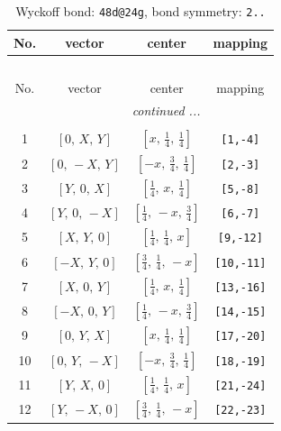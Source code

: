 \documentclass[fleqn,8pt]{jsarticle}
\begin{document}
\renewcommand{\arraystretch}{1.2}
\begin{longtable}{cccc}
\caption{Wyckoff bond: {\tt 48d@24g}, bond symmetry: {\tt 2..}}
 \\
 \hline \hline
No. & vector & center & mapping \\ \hline \endfirsthead

\multicolumn{3}{l}{\tablename\ \thetable{}} \\
 \hline \hline
No. & vector & center & mapping \\ \hline \endhead

 \hline \hline
\multicolumn{3}{r}{\footnotesize\it continued ...} \\ \endfoot

 \hline \hline
\multicolumn{3}{r}{} \\ \endlastfoot

1 & $\left[ 0,\, X,\, Y \right]$ & $\left[ x,\, \frac{1}{4},\, \frac{1}{4} \right]$ & {\tt [1,-4]} \\ \hline
2 & $\left[ 0,\, - X,\, Y \right]$ & $\left[ - x,\, \frac{3}{4},\, \frac{1}{4} \right]$ & {\tt [2,-3]} \\ \hline
3 & $\left[ Y,\, 0,\, X \right]$ & $\left[ \frac{1}{4},\, x,\, \frac{1}{4} \right]$ & {\tt [5,-8]} \\ \hline
4 & $\left[ Y,\, 0,\, - X \right]$ & $\left[ \frac{1}{4},\, - x,\, \frac{3}{4} \right]$ & {\tt [6,-7]} \\ \hline
5 & $\left[ X,\, Y,\, 0 \right]$ & $\left[ \frac{1}{4},\, \frac{1}{4},\, x \right]$ & {\tt [9,-12]} \\ \hline
6 & $\left[ - X,\, Y,\, 0 \right]$ & $\left[ \frac{3}{4},\, \frac{1}{4},\, - x \right]$ & {\tt [10,-11]} \\ \hline
7 & $\left[ X,\, 0,\, Y \right]$ & $\left[ \frac{1}{4},\, x,\, \frac{1}{4} \right]$ & {\tt [13,-16]} \\ \hline
8 & $\left[ - X,\, 0,\, Y \right]$ & $\left[ \frac{1}{4},\, - x,\, \frac{3}{4} \right]$ & {\tt [14,-15]} \\ \hline
9 & $\left[ 0,\, Y,\, X \right]$ & $\left[ x,\, \frac{1}{4},\, \frac{1}{4} \right]$ & {\tt [17,-20]} \\ \hline
10 & $\left[ 0,\, Y,\, - X \right]$ & $\left[ - x,\, \frac{3}{4},\, \frac{1}{4} \right]$ & {\tt [18,-19]} \\ \hline
11 & $\left[ Y,\, X,\, 0 \right]$ & $\left[ \frac{1}{4},\, \frac{1}{4},\, x \right]$ & {\tt [21,-24]} \\ \hline
12 & $\left[ Y,\, - X,\, 0 \right]$ & $\left[ \frac{3}{4},\, \frac{1}{4},\, - x \right]$ & {\tt [22,-23]} \\
\end{longtable}
\end{document}
